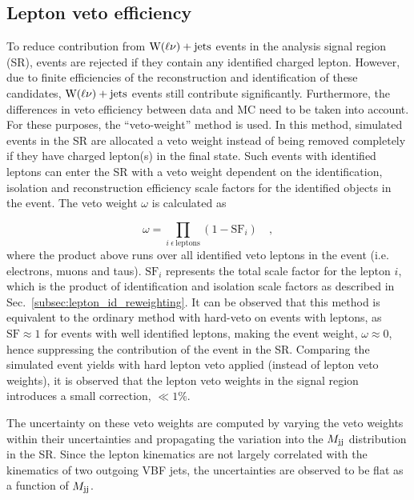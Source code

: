 \clearpage

\subsection{Lepton veto efficiency}
\label{subsec:veto_weight_reweighting}

To reduce contribution from $\textrm{W}(\ell\nu)+\textrm{jets}$ events in the analysis signal region (SR), 
events are rejected if they contain any
identified charged lepton. However, due to finite efficiencies of the
reconstruction and identification of these candidates, $\textrm{W}(\ell\nu)+\textrm{jets}$
events still contribute significantly. Furthermore, the differences in veto efficiency between data and MC
need to be taken into account. For these purposes, the ``veto-weight'' method is used.
In this method, simulated events in the SR are allocated a veto weight instead of
being removed completely if they have charged lepton(s) in the final state. Such events with
identified leptons can enter the SR with a veto weight dependent on the identification, isolation and reconstruction 
efficiency scale factors for the identified objects
in the event. The veto weight $\omega$ is calculated as

\begin{equation}
    \omega = \prod_{i \ \epsilon \ \textrm{leptons}} (1-\textrm{SF}_{i}) \quad ,
\end{equation}
where the product above runs over all identified veto leptons in the event (i.e. electrons, muons and taus).
$\textrm{SF}_{i}$ represents the total scale factor for the lepton $i$, which is the product of identification and isolation
scale factors as described in Sec.~\ref{subsec:lepton_id_reweighting}. It can be observed that this method is equivalent
to the ordinary method with hard-veto on events with leptons, as $\textrm{SF} \approx 1$ for events with well identified leptons,
making the event weight, $\omega \approx 0$, hence suppressing the contribution of the event in the SR.
Comparing the simulated event yields with hard
lepton veto applied (instead of lepton veto weights), it is observed that the lepton veto weights in the signal region
introduces a small correction, $\ll 1\%$.

The uncertainty on these veto weights are computed by varying the veto weights within their uncertainties and
propagating the variation into the $M_{\textrm{jj}}$ distribution in the SR. Since the lepton kinematics are not largely
correlated with the kinematics of two outgoing VBF jets, the uncertainties are observed to be flat as a function
of $M_{\textrm{jj}}$.

